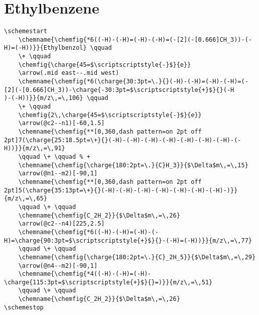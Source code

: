 \newpage


\section{Ethylbenzene}\label{app:ethylbenzene}
\begin{lstlisting}
\schemestart
    \chemname{\chemfig{*6((-H)-(-H)=(-H)-(-H)=(-[2](-[0.666]CH_3))-(-H)=(-H))}}{Ethylbenzol} \qquad
    \+ \qquad
    \chemfig{\charge{45=$\scriptscriptstyle{-}$}{e}}
    \arrow(.mid east--.mid west)
    \chemname{\chemfig{*6(\charge{30:3pt=\.}{}(-H)-(-H)=(-H)-(-H)=(-[2](-[0.666]CH_3))-\charge{-30:3pt=$\scriptscriptstyle{+}$}{}(-H
)-(-H))}}{m/z\,=\,106} \qquad
    \+ \qquad
    \chemfig{2\,\charge{45=$\scriptscriptstyle{-}$}{e}}
    \arrow(@c2--n1)[-60,1.5]
    \chemname{\chemfig{**[0,360,dash pattern=on 2pt off 2pt]7(\charge{25:18.5pt=\+}{}(-H)-(-H)-(-H)-(-H)-(-H)-(-H)-(-H)-(-H))}}{m/z\,=\,91}
    \qquad \+ \qquad % +
    \chemname{\chemfig{\charge{180:2pt=\.}{C}H_3}}{$\Delta$m\,=\,15}
    \arrow(@n1--m2)[-90,1]
    \chemname{\chemfig{**[0,360,dash pattern=on 2pt off 2pt]5(\charge{35:13pt=\+}{}(-H)-(-H)-(-H)-(-H)-(-H)-(-H)-(-H)-)}}{m/z\,=\,65}
    \qquad \+ \qquad
    \chemname{\chemfig{C_2H_2}}{$\Delta$m\,=\,26}
    \arrow(@c2--n4)[225,2.5]
    \chemname{\chemfig{*6((-H)-(-H)=(-H)-(-H)=\charge{90:3pt=$\scriptscriptstyle{+}$}{}-(-H)=(-H))}}{m/z\,=\,77}
    \qquad \+ \qquad
    \chemname{\chemfig{\charge{180:2pt=\.}{C}_2H_5}}{$\Delta$m\,=\,29}
    \arrow(@n4--m2)[-90,1]
    \chemname{\chemfig{*4((-H)-(-H)=(-H)-\charge{115:3pt=$\scriptscriptstyle{+}$}{}=)}}{m/z\,=\,51}
    \qquad \+ \qquad
    \chemname{\chemfig{C_2H_2}}{$\Delta$m\,=\,26}
\schemestop
\end{lstlisting}


